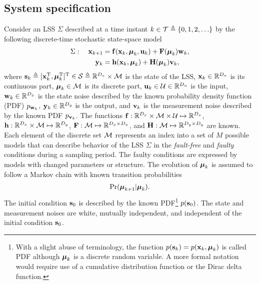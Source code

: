 \documentclass[conference,10pt]{IEEEtran}
\begin{document}
\subsection{System specification}\label{sec:system_specification}
Consider an LSS $\Sigma$ described at a time instant $k\in\mathcal{T}\triangleq\{0,1,2,\ldots\}$ by the following discrete-time stochastic state-space model
\begin{subequations}\label{ali:LSS}
	\begin{align}
		\Sigma: \quad  \mathbf{x}_{k+1} & =\mathbf{f}(\mathbf{x}_k,\boldsymbol{\mu}_k,\mathbf{u}_k)+\mathbf{F}(\boldsymbol{\mu}_k)\mathbf{w}_k, \label{ali:LSSdynamics} \\
		\mathbf{y}_{k} & =\mathbf{h}(\mathbf{x}_k,\boldsymbol{\mu}_k)+\mathbf{H}(\boldsymbol{\mu}_k)\mathbf{v}_k, \label{ali:LSSmeasurement}
	\end{align}
\end{subequations}
where $\mathbf{s}_{k} \triangleq [\mathbf{x}^{\text{T}}_{k},\boldsymbol{\mu}^{\text{T}}_{k}]^{\text{T}} \in \mathcal{S} \triangleq \mathbb{R}^{D_x} \times \mathcal{M}$ is the state of the LSS, $\mathbf{x}_k\in\mathbb{R}^{D_x}$ is its continuous part, $\boldsymbol{\mu}_k\in\mathcal{M}$ is its discrete part, $\mathbf{u}_{k}\in\mathcal{U}\in\mathbb{R}^{D_u}$ is the input, $\mathbf{w}_k\in\mathbb{R}^{D_x}$ is the state noise described by the known probability density function (PDF) $p_{\mathbf{w}_k}$, $\mathbf{y}_k\in\mathbb{R}^{D_y}$ is the output, and $\mathbf{v}_k$ is the measurement noise described by the known PDF $p_{\mathbf{v}_k}$. 
The functions $\mathbf{f}: \mathbb{R}^{D_x}\times\mathcal{M}\times\mathcal{U}\mapsto\mathbb{R}^{D_x}$, $\mathbf{h}: \mathbb{R}^{D_x}\times\mathcal{M}\mapsto\mathbb{R}^{D_y}$, $\mathbf{F}: \mathcal{M}\mapsto \mathbb{R}^{D_x\times D_x}$, and $\mathbf{H}: \mathcal{M}\mapsto \mathbb{R}^{D_y\times D_y}$ are known. 
Each element of the discrete set $\mathcal{M}$ represents an index into a set of $M$ possible models that can describe behavior of the LSS $\Sigma$ in the \emph{fault-free} and \emph{faulty} conditions during a sampling period. 
The faulty conditions are expressed by models with changed parameters or structure. 
The evolution of $\boldsymbol{\mu}_k$ is assumed to follow a Markov chain with known transition probabilities
\begin{align}
	\Pr(\boldsymbol{\mu}_{k+1}\vert\boldsymbol{\mu}_{k}). \label{ali:LSStransition}
\end{align}
The initial condition $\mathbf{s}_{0}$ is described by the known PDF\footnote{With a slight abuse of terminology, the function $p(\mathbf{s}_{k}) = p(\mathbf{x}_{k}, \boldsymbol{\mu}_{k})$ is called PDF although $\boldsymbol{\mu}_{k}$ is a discrete random variable. 
A more formal notation would require use of a cumulative distribution function or the Dirac delta function.} $p(\mathbf{s}_{0})$. 
The state and measurement noises are white, mutually independent, and independent of the initial condition $\mathbf{s}_{0}$. 
\end{document}
